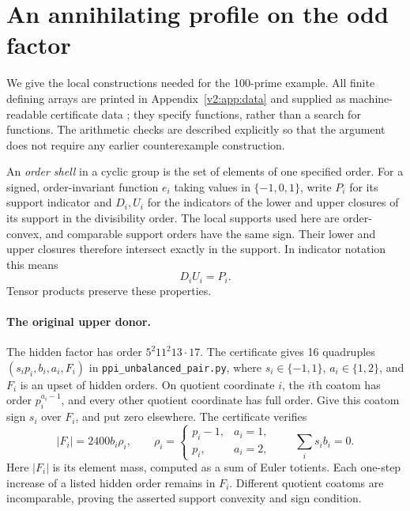 \documentclass[11pt]{article}
\numberwithin{equation}{section}
\theoremstyle{definition}
\theoremstyle{remark}
\begin{document}
\section{An annihilating profile on the odd factor}
\label{h100:interpolation}

We give the local constructions needed for the 100-prime example.  All
finite defining arrays are printed in Appendix~\ref{v2:app:data} and supplied
as machine-readable certificate data \cite{ConstructionH100};
they specify functions, rather than a search for functions.  The arithmetic
checks are described explicitly so that the argument does not require any
earlier counterexample construction.

An \emph{order shell} in a cyclic group is the set of elements of one
specified order.  For a signed, order-invariant function $e_i$ taking
values in $\{-1,0,1\}$, write $P_i$ for its support indicator and $D_i,U_i$
for the indicators of the lower and upper closures of its support in the
divisibility order.  The local supports used here are order-convex, and
comparable support orders have the same sign.  Their lower and upper
closures therefore intersect exactly in the support.  In indicator
notation this means
\begin{equation}\label{h100:local-convexity}
 D_iU_i=P_i.
\end{equation}
Tensor products preserve these properties.

\paragraph{The original upper donor.}
The hidden factor has order $5^2 11^2 13\cdot17$.  The certificate gives
16 quadruples $(s_i p_i,b_i,a_i,F_i)$ in \texttt{ppi\_unbalanced\_pair.py}, where $s_i\in\{-1,1\}$,
$a_i\in\{1,2\}$, and $F_i$ is an upset of hidden orders.  On quotient
coordinate $i$, the $i$th coatom has order $p_i^{a_i-1}$, and every other
quotient coordinate has full order.  Give this coatom sign $s_i$ over
$F_i$, and put zero elsewhere.  The certificate verifies
\begin{equation}\label{h100:upper-fibres}
 |F_i|=2400 b_i\rho_i,\qquad
 \rho_i=\begin{cases}p_i-1,&a_i=1,\\p_i,&a_i=2,\end{cases}
 \qquad \sum_i s_i b_i=0.
\end{equation}
Here $|F_i|$ is its element mass, computed as a sum of Euler totients.
Each one-step increase of a listed hidden order remains in $F_i$.
Different quotient coatoms are incomparable, proving the asserted
support convexity and sign condition.
\end{document}
